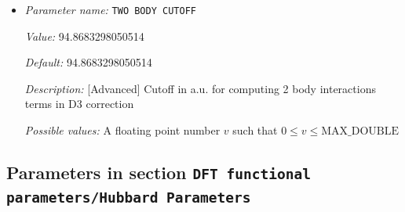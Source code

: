 \begin{itemize}
{\it Value:} 40.0


{\it Default:} 40.0


{\it Description:} [Advanced] Cutoff in a.u. for computing 3 body interactions terms in D3 correction


{\it Possible values:} A floating point number $v$ such that $0 \leq v \leq \text{MAX\_DOUBLE}$
\item {\it Parameter name:} {\tt TWO BODY CUTOFF}
\label{parameters:DFT functional parameters/Dispersion Correction/TWO BODY CUTOFF}
\label{parameters:DFT_20functional_20parameters/Dispersion_20Correction/TWO_20BODY_20CUTOFF}


{\it Value:} 94.8683298050514


{\it Default:} 94.8683298050514


{\it Description:} [Advanced] Cutoff in a.u. for computing 2 body interactions terms in D3 correction


{\it Possible values:} A floating point number $v$ such that $0 \leq v \leq \text{MAX\_DOUBLE}$
\end{itemize}

\subsection{Parameters in section \tt DFT functional parameters/Hubbard Parameters}
\label{parameters:DFT_20functional_20parameters/Hubbard_20Parameters}

